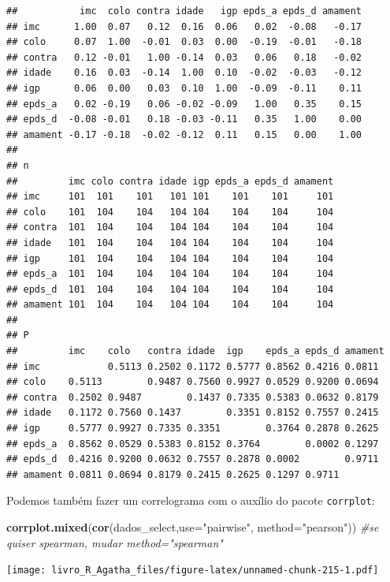 \documentclass[
]{book}
\newenvironment{Shaded}{\begin{snugshade}}{\end{snugshade}}
\newcommand{\CommentTok}[1]{\textcolor[rgb]{0.56,0.35,0.01}{\textit{#1}}}
\newcommand{\DataTypeTok}[1]{\textcolor[rgb]{0.13,0.29,0.53}{#1}}
\newcommand{\KeywordTok}[1]{\textcolor[rgb]{0.13,0.29,0.53}{\textbf{#1}}}
\newcommand{\NormalTok}[1]{#1}
\newcommand{\StringTok}[1]{\textcolor[rgb]{0.31,0.60,0.02}{#1}}
\begin{document}
\begin{verbatim}
##           imc  colo contra idade   igp epds_a epds_d amament
## imc      1.00  0.07   0.12  0.16  0.06   0.02  -0.08   -0.17
## colo     0.07  1.00  -0.01  0.03  0.00  -0.19  -0.01   -0.18
## contra   0.12 -0.01   1.00 -0.14  0.03   0.06   0.18   -0.02
## idade    0.16  0.03  -0.14  1.00  0.10  -0.02  -0.03   -0.12
## igp      0.06  0.00   0.03  0.10  1.00  -0.09  -0.11    0.11
## epds_a   0.02 -0.19   0.06 -0.02 -0.09   1.00   0.35    0.15
## epds_d  -0.08 -0.01   0.18 -0.03 -0.11   0.35   1.00    0.00
## amament -0.17 -0.18  -0.02 -0.12  0.11   0.15   0.00    1.00
## 
## n
##         imc colo contra idade igp epds_a epds_d amament
## imc     101  101    101   101 101    101    101     101
## colo    101  104    104   104 104    104    104     104
## contra  101  104    104   104 104    104    104     104
## idade   101  104    104   104 104    104    104     104
## igp     101  104    104   104 104    104    104     104
## epds_a  101  104    104   104 104    104    104     104
## epds_d  101  104    104   104 104    104    104     104
## amament 101  104    104   104 104    104    104     104
## 
## P
##         imc    colo   contra idade  igp    epds_a epds_d amament
## imc            0.5113 0.2502 0.1172 0.5777 0.8562 0.4216 0.0811 
## colo    0.5113        0.9487 0.7560 0.9927 0.0529 0.9200 0.0694 
## contra  0.2502 0.9487        0.1437 0.7335 0.5383 0.0632 0.8179 
## idade   0.1172 0.7560 0.1437        0.3351 0.8152 0.7557 0.2415 
## igp     0.5777 0.9927 0.7335 0.3351        0.3764 0.2878 0.2625 
## epds_a  0.8562 0.0529 0.5383 0.8152 0.3764        0.0002 0.1297 
## epds_d  0.4216 0.9200 0.0632 0.7557 0.2878 0.0002        0.9711 
## amament 0.0811 0.0694 0.8179 0.2415 0.2625 0.1297 0.9711
\end{verbatim}

Podemos também fazer um correlograma com o auxílio do pacote \texttt{corrplot}:

\begin{Shaded}
\begin{Highlighting}[]
\KeywordTok{corrplot.mixed}\NormalTok{(}\KeywordTok{cor}\NormalTok{(dados_select,}\DataTypeTok{use=}\StringTok{"pairwise"}\NormalTok{,}
                   \DataTypeTok{method=}\StringTok{"pearson"}\NormalTok{)) }\CommentTok{#se quiser spearman, mudar method="spearman"}
\end{Highlighting}
\end{Shaded}

\texttt{[image: livro\_R\_Agatha\_files/figure-latex/unnamed-chunk-215-1.pdf]}

  
\end{document}
